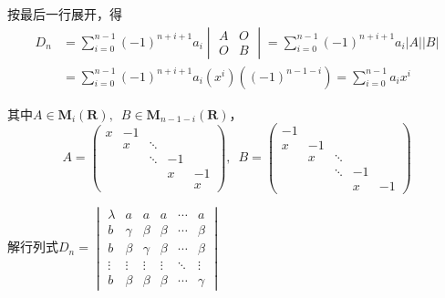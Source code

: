 \begin{solution}
    按最后一行展开，得
    \begin{align*}
        D_n & =\sum_{i=0}^{n-1}(-1)^{n+i+1}a_i\begin{vmatrix} A & O \\ O & B \end{vmatrix}
        =\sum_{i=0}^{n-1}(-1)^{n+i+1}a_i|A||B|                                                        \\
            & =\sum_{i=0}^{n-1}(-1)^{n+i+1}a_i(x^i)\left((-1)^{n-1-i}\right) =\sum_{i=0}^{n-1}a_i x^i
    \end{align*}

    其中$A\in \mathbf{M}_i(\mathbf{R}),\enspace B\in \mathbf{M}_{n-1-i}(\mathbf{R})$，
    \[ A=\begin{pmatrix}
            x & -1 &        &    &    \\
              & x  & \ddots &    &    \\
              &    & \ddots & -1 &    \\
              &    &        & x  & -1 \\
              &    &        &    & x
        \end{pmatrix},\enspace
        B=\begin{pmatrix}
            -1 &    &        &    &    \\
            x  & -1 &        &    &    \\
               & x  & \ddots &    &    \\
               &    & \ddots & -1 &    \\
               &    &        & x  & -1
        \end{pmatrix} \]
\end{solution}

\begin{example}
    解行列式$D_n=\begin{vmatrix}
            \lambda & a      & a      & a      & \cdots & a      \\
            b       & \gamma & \beta  & \beta  & \cdots & \beta  \\
            b       & \beta  & \gamma & \beta  & \cdots & \beta  \\
            \vdots  & \vdots & \vdots & \vdots & \ddots & \vdots \\
            b       & \beta  & \beta  & \beta  & \cdots & \gamma
        \end{vmatrix}$
\end{example}

